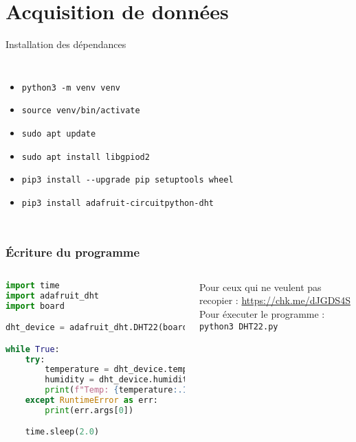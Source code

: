 \documentclass[aspectratio=169,xcolor=dvipsnames]{beamer}
\begin{document}
\section{Acquisition de données}

\begin{frame}{Installation des dépendances}
    \begin{columns}[c] %

        \begin{itemize}
            \item \texttt{python3 -m venv venv}
            \item \texttt{source venv/bin/activate}
            \item \texttt{sudo apt update}
            \item \texttt{sudo apt install libgpiod2}
            \item \texttt{pip3 install -{}-upgrade pip setuptools wheel}
            \item \texttt{pip3 install adafruit-circuitpython-dht}
        \end{itemize}

    \end{columns}
\end{frame}

\begin{frame}[fragile]
\frametitle{Écriture du programme}
    \begin{columns}[c] %

        \begin{lstlisting}[language=Python, caption=DHT22.py]
import time
import adafruit_dht
import board

dht_device = adafruit_dht.DHT22(board.D4)

while True:
    try:
        temperature = dht_device.temperature
        humidity = dht_device.humidity
        print(f"Temp: {temperature:.1f}C / Humi: {humidity:.1f}%")
    except RuntimeError as err:
        print(err.args[0])

    time.sleep(2.0)
        \end{lstlisting}

        Pour ceux qui ne veulent pas recopier :
        \url{https://chk.me/dJGDS4S} \\
        \vspace{5mm}
        Pour éxecuter le programme :
        \texttt{python3 DHT22.py}
    \end{columns}
\end{frame}
\end{document}
